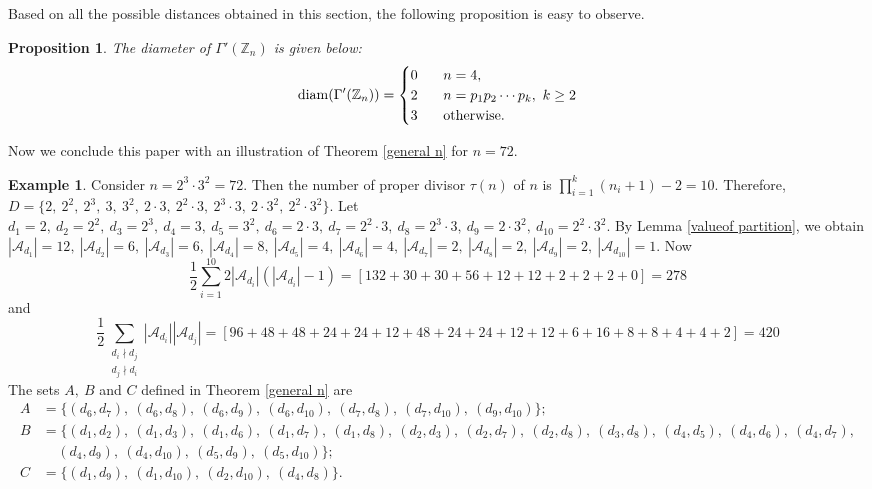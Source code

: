 \documentclass{amsart}
\theoremstyle{plain}
\newtheorem{proposition}[theorem]{Proposition}
\theoremstyle{definition}
\newtheorem{example}[theorem]{Example}
\theoremstyle{remark}
\begin{document}
Based on all the possible distances obtained in this section, the following proposition is easy to observe.


\begin{proposition}\label{diameterpro}
The diameter of $\Gamma'(\mathbb{Z}_n)$ is given below:
\[{\rm diam}(\Gamma'(\mathbb{Z}_n)) =
  \begin{cases}
0  & \;\; \;n = 4, \\
2  & \;\;\;n = p_1p_2\cdots p_k,~ k \geq 2\\
3 & \;\;\;{\rm otherwise.}
  \end{cases}\]
\end{proposition}


Now we conclude this paper with an illustration of Theorem \ref{general n} for $n= 72$.

\begin{example}
Consider $n= 2^3 \cdot 3^2 = 72$. Then the number of proper divisor $\tau (n)$ of $n$ is $\prod_{i=1}^{k} (n_i + 1)- 2 = 10$. Therefore, $D= \{ 2, \ 2^2, \ 2^3, \ 3, \ 3^2, \ 2 \cdot 3, \ 2^2 \cdot 3, \ 2^3 \cdot 3, \ 2 \cdot 3^2, \ 2^2 \cdot 3^2 \}$. Let $ d_1=2, \ d_2=2^2, \ d_3=2^3, \ d_4=3, \ d_5=3^2, \ d_6=2 \cdot 3, \ d_7=2^2 \cdot 3, \ d_8=2^3 \cdot 3, \ d_9=2 \cdot 3^2, \ d_{10}=2^2 \cdot 3^2 $. By Lemma \ref{valueof partition},  we obtain $|\mathcal{A}_{d_1}| = 12, \ |\mathcal{A}_{d_2}| = 6, \ |\mathcal{A}_{d_3}| = 6, \ |\mathcal{A}_{d_4}| = 8, \ |\mathcal{A}_{d_5}| = 4, \ |\mathcal{A}_{d_6}| = 4, \ |\mathcal{A}_{d_7}| = 2, \ |\mathcal{A}_{d_8}| = 2, \ |\mathcal{A}_{d_9}| = 2, \ |\mathcal{A}_{d_{10}}| = 1$. Now
\[\dfrac{1}{2}\sum_{i=1}^{10} 2 |\mathcal{A}_{d_i}| \left(|\mathcal{A}_{d_i}| -1 \right) = [132+30+30+56+12+12+2+2+2+0] = 278\]
and
\[  \dfrac{1}{2}\sum_{\substack{d_i \nmid d_j \\ d_j \nmid d_i}}|\mathcal{A}_{d_i}||\mathcal{A}_{d_j}| = [ 96+48+48+24+24+12+48+24+24+12+12+6+16+8+8+4+4+2]  = 420\]
The sets $A, \ B$ and  $C $ defined in Theorem \ref{general n} are
 \begin{align*}
     A &= \{ (d_6, d_7),\ (d_6, d_8),\ (d_6, d_9),\ (d_6, d_{10}),\ (d_7, d_8),\ (d_7, d_{10}),\ (d_9, d_{10}) \}; \\
     B &= \{ (d_1, d_2),\ (d_1, d_3),\ (d_1, d_6), \ (d_1, d_7),\ (d_1, d_8),\ (d_2, d_3),\ (d_2, d_7),\ (d_2, d_8),\ (d_3, d_8),\ (d_4, d_5),\ (d_4, d_6),\ (d_4, d_7),\\
     &\ \ \ \ \ (d_4, d_9),\ (d_4, d_{10}),\ (d_5, d_9),\ (d_5, d_{10})\}; \\
     C &= \{ (d_1, d_9),\ (d_1, d_{10}),\ (d_2, d_{10}),\ (d_4, d_8)\}.

\end{align*}
\end{example}
\end{document}
